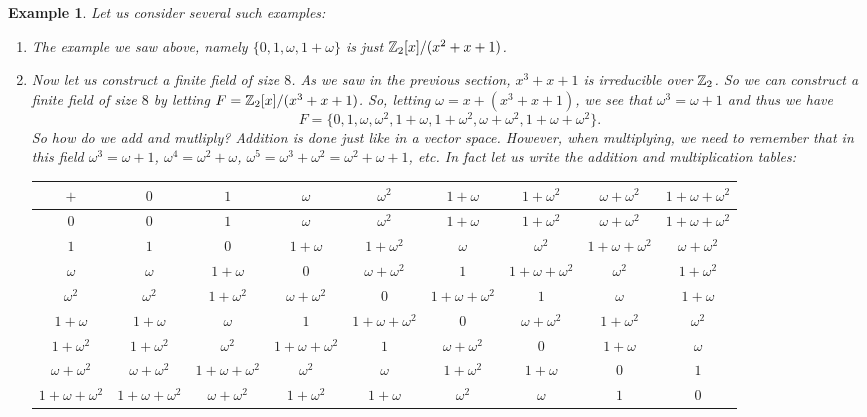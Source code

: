 \documentclass[12pt]{article}
\theoremstyle{plain}
\newtheorem{example}{Example}
\theoremstyle{definition}
\theoremstyle{remark}
\begin{document}
\begin{example}
Let us consider several such examples:
\begin{enumerate}
    \item The example we saw above, namely $\{0,1,\omega, 1+\omega\}$ is just $\mathbb{Z}_2[x]/(x^2+x+1)$.
    \item Now let us construct a finite field of size $8$. As we saw in the previous section, $x^3+x+1$ is irreducible over $\mathbb{Z}_2$. So we can construct a finite field of size $8$ by letting $F= \mathbb{Z}_2[x]/(x^3+x+1)$. 
    So, letting $\omega = x+(x^3+x+1)$, we see that $\omega^3=\omega+1$ and thus we have 
    $$F = \{0,1, \omega, \omega ^2, 1+\omega, 1+\omega^2, \omega+\omega^2, 1+\omega+\omega^2\}.$$ So how do we add and mutliply? Addition is done just like in a vector space. However, when multiplying, we need to remember that in this field $\omega^3=\omega+1$, $\omega^4=\omega^2+\omega$, $\omega^5 = \omega^3+\omega^2= \omega^2+\omega+1$, etc.  In fact let us write the addition and multiplication tables:


\begin{table}[H]
\footnotesize{
\begin{tabular}{ c| c | c |c|c|c|c|c|c}
$+$  & $0$ & $1$ & $\omega$ & $\omega^2$ & $1+\omega$ & $1+\omega^2$ & $\omega+\omega^2$ & $1+\omega+\omega^2$ \\
\hline
$0$ &$0$ & $1$ & $\omega$ & $\omega^2$ & $1+\omega$ & $1+\omega^2$ & $\omega+\omega^2$ & $1+\omega+\omega^2$   \\ 
\hline
$1$ & $1$ & $0$ & $1+\omega$ & $1+\omega^2$ & $\omega$ & $\omega^2$ & $1+\omega+\omega^2$ & $\omega+\omega^2$  \\ 
\hline
$\omega$ & $\omega$ & $1+\omega$ & $0$ & $\omega+\omega^2$  & $1$ & $1+\omega+\omega^2$ & $\omega^2$ & $1+\omega^2$\\ 
\hline
$\omega^2$ & $\omega^2$& $1+\omega^2$ & $\omega+\omega^2$&$0$ & $1+\omega+\omega^2$ &$1$& $\omega$ & $ 1+\omega$\\
\hline
$1+\omega$ & $1+\omega$& $\omega$ & $1$&$1+\omega+\omega^2$ & $0$ &$\omega+\omega^2$& $1+\omega^2$ & $\omega^2$\\
\hline
$1+\omega^2$ & $1+\omega^2$& $\omega^2$&$1+\omega+\omega^2$ & $1$&$\omega+\omega^2$ &$0$& $1+\omega$ & $\omega$\\
\hline
$\omega+\omega^2$ & $\omega+\omega^2$&$1+\omega+\omega^2$& $\omega^2$&$\omega$ & $1+\omega^2$&$1+\omega$ &$0$& $1$\\
\hline
$1+\omega+\omega^2$ & $1+\omega+\omega^2$&$\omega+\omega^2$& $1+\omega^2$&$1+\omega$ & $\omega^2$&$\omega$ &$1$& $0$\\


\end{tabular}}
\end{table}
\end{enumerate}
\end{example}
\end{document}
